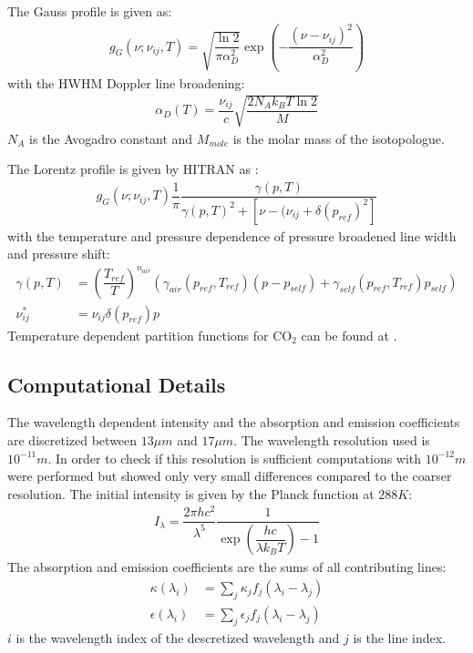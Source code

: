 The Gauss profile is given as:
\begin{align*}
	g_G(\nu;\nu_{ij}, T) = \sqrt{\dfrac{\ln 2}{\pi \alpha_D^2}} \exp\left(- \dfrac{(\nu - \nu_{ij})^2}{\alpha_D^2}\right)
\end{align*}
with the HWHM Doppler line broadening:
\begin{align*}
	\alpha_D(T) = \dfrac{\nu_{ij}}{c} \sqrt{\dfrac{2 N_A k_B T \ln 2}{M}}
\end{align*}
$N_A$ is the Avogadro constant and $M_{mole}$ is the molar mass of the isotopologue.
\newline

The Lorentz profile is given by HITRAN as \cite{hitran2}:
\begin{align*}
	g_G(\nu;\nu_{ij}, T) \dfrac{1}{\pi} \dfrac{\gamma(p,T)}{\gamma(p,T)^2 + \left[ \nu - (\nu_{ij} + \delta(p_{ref})^2\right]}
\end{align*}
with the temperature and pressure dependence of pressure broadened line width and pressure shift:
\begin{align*}
	\gamma(p, T) &= \left(\dfrac{T_{ref}}{T}\right)^{n_{air}}
	               \left(  \gamma_{air} (p_{ref}, T_{ref}) (p - p_{self}) +
	                       \gamma_{self}(p_{ref}, T_{ref}) p_{self}  \right) 		 \\
	\nu_{ij}^*   &= \nu_{ij} \delta(p_{ref}) p
\end{align*}
Temperature dependent partition functions for $\mathrm{CO}_2$ can be found at \cite{hitran3}.

\subsection{Computational Details}

The wavelength dependent intensity and the absorption and emission coefficients are discretized between $13 \mu m$ and $17 \mu m$. The wavelength resolution used is $10^{-11} m$. In order to check if this resolution is sufficient computations with $10^{-12} m$ were performed but showed only very small differences compared to the coarser resolution.
\newline
\newline
The initial intensity is given by the Planck function at $288 K$:
\begin{align}
	I_\lambda = \dfrac{2 \pi h c^2}{\lambda^5} \dfrac{1}{\exp\left(\dfrac{h c}{\lambda k_B T}\right) - 1}
\end{align}
The absorption and emission coefficients are the sums of all contributing lines:
\begin{align*}
	\kappa(\lambda_i)   &= \sum_j \kappa_j   f_j(\lambda_i - \lambda_j) \\
	\epsilon(\lambda_i) &= \sum_j \epsilon_j f_j(\lambda_i - \lambda_j)
\end{align*}
$i$ is the wavelength index of the descretized wavelength and $j$ is the line index.


